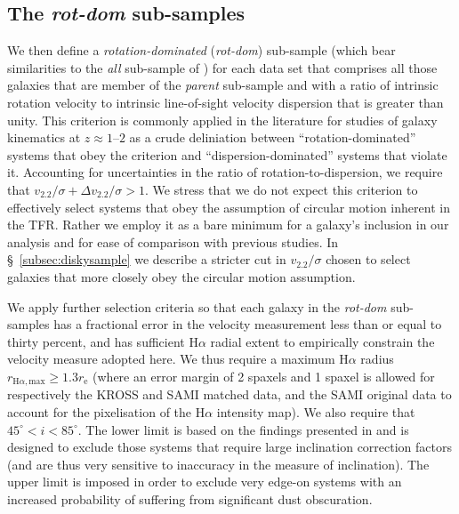\documentclass[a4paper,fleqn,usenatbib]{mnras}
\begin{document}
{\subsection{The \textit{rot-dom} sub-samples}
\label{subsec:rotdomsample}

We then define a \textit{rotation-dominated} (\textit{rot-dom}) sub-sample (which bear similarities to the \textit{all} sub-sample of \citealt{Tiley:2016}) for each data set that comprises all those galaxies that are member of the \textit{parent} sub-sample and with a ratio of intrinsic rotation velocity to intrinsic line-of-sight velocity dispersion that is greater than unity. This criterion is commonly applied in the literature for studies of galaxy kinematics at $z\approx1$--$2$ \citep[e.g.][]{Genzel:2006,ForsterSchreiber:2009,Epinat:2012,Stott:2016,Tiley:2016,Harrison:2017,Johnson:2018} as a crude deliniation between ``rotation-dominated'' systems that obey the criterion and ``dispersion-dominated'' systems that violate it. Accounting for uncertainties in the ratio of rotation-to-dispersion, we require that $v_{2.2}/\sigma + \Delta v_{2.2}/\sigma >1$. We stress that we do not expect this criterion to effectively select systems that obey the assumption of circular motion inherent in the TFR. Rather we employ it as a bare minimum for a galaxy's inclusion in our analysis and for ease of comparison with previous studies. In \S~\ref{subsec:diskysample} we describe a stricter cut in $v_{2.2}/\sigma$ chosen to select galaxies that more closely obey the circular motion assumption.

We apply further selection criteria so that each galaxy in the \textit{rot-dom} sub-samples has a fractional error in the velocity measurement less than or equal to thirty percent, and has sufficient H$\alpha$ radial extent to empirically constrain the velocity measure adopted here. We thus require a maximum H$\alpha$ radius $r_{\text{H}\alpha,\text{max}} \ge 1.3r_{\text{e}}$ (where an error margin of 2 spaxels and 1 spaxel is allowed for respectively the KROSS and SAMI matched data, and the SAMI original data to account for the pixelisation of the H$\alpha$ intensity map). We also require that $45^\circ < i < 85^\circ$. The lower limit is based on the findings presented in \citet{Tiley:2016b} and is designed to exclude those systems that require large inclination correction factors (and are thus very sensitive to inaccuracy in the measure of inclination). The upper limit is imposed in order to exclude very edge-on systems with an increased probability of suffering from significant dust obscuration. 

}
\end{document}
